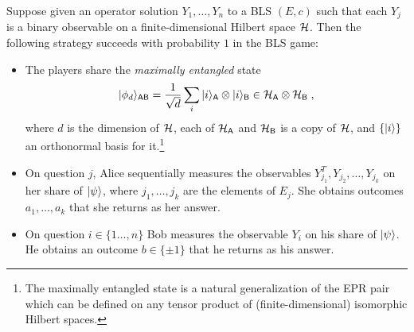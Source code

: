 \begin{lemma}\label{lem:bcs-perfect}
Suppose given an operator solution $Y_1,\ldots,Y_n$ to a BLS $(E,c)$ such that each $Y_j$ is a binary observable on a finite-dimensional Hilbert space $\mathcal{H}$. Then the following strategy succeeds with probability $1$ in the BLS game:
\begin{itemize}
\item The players share the \emph{maximally entangled} state 
\begin{equation}\label{eq:psi-bls}
 |\phi_d\rangle_{{\textsf{AB}}} = \frac{1}{\sqrt{d}} \sum_{i} |i\rangle_{{\textsf{A}}} \otimes |i\rangle_{{\textsf{B}}} \in \mathcal{H}_{\textsf{A}} \otimes \mathcal{H}_{\textsf{B}}\;,
\end{equation}
 where $d$ is the dimension of $\mathcal{H}$, each of $\mathcal{H}_{\textsf{A}}$ and $\mathcal{H}_{\textsf{B}}$ is a copy of $\mathcal{H}$, and $\{|i\rangle\}$ an orthonormal basis for it.\footnote{The maximally entangled state is a natural generalization of the EPR pair which can be defined on any tensor product of (finite-dimensional) isomorphic Hilbert spaces.}
\item On question $j$, Alice sequentially measures the observables $Y_{j_1}^T,Y_{j_2},\ldots,Y_{j_k}$ on her share of $|\psi\rangle$, where $j_1,\ldots,j_k$ are the elements of $E_j$. She obtains outcomes $a_1,\ldots,a_k$ that she returns as her answer. 
\item On question $i\in \{1\ldots,n\}$ Bob measures the observable $Y_{i}$ on his share of $|\psi\rangle$. He obtains an outcome $b\in\{\pm 1\}$ that he returns as his answer. 
\end{itemize}
\end{lemma}

